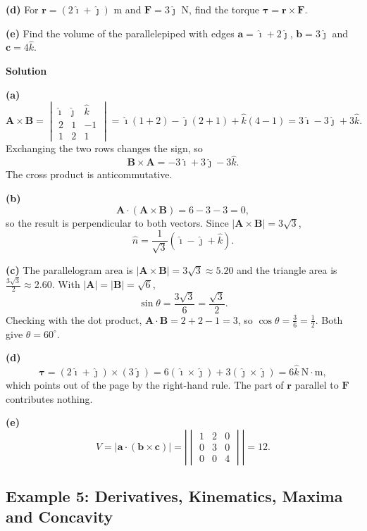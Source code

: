 \documentclass[../main.tex]{subfiles}
\begin{document}
\textbf{(d)} For $\mathbf{r} = (2\hat{\imath}+\hat{\jmath})$ m and $\mathbf{F} = 3\hat{\jmath}$ N, find the torque $\boldsymbol{\tau} = \mathbf{r}\times\mathbf{F}$.

\textbf{(e)} Find the volume of the parallelepiped with edges $\mathbf{a} = \hat{\imath}+2\hat{\jmath}$, $\mathbf{b} = 3\hat{\jmath}$ and $\mathbf{c} = 4\hat{k}$.

\bigskip
\textbf{Solution}

\textbf{(a)}
\[
\mathbf{A}\times\mathbf{B}
= \begin{vmatrix}
\hat{\imath} & \hat{\jmath} & \hat{k}\\
2 & 1 & -1\\
1 & 2 & 1
\end{vmatrix}
= \hat{\imath}(1+2) - \hat{\jmath}(2+1) + \hat{k}(4-1)
= 3\hat{\imath}-3\hat{\jmath}+3\hat{k}.
\]
Exchanging the two rows changes the sign, so
\[
\mathbf{B}\times\mathbf{A} = -3\hat{\imath}+3\hat{\jmath}-3\hat{k}.
\]
The cross product is anticommutative.

\textbf{(b)}
\[
\mathbf{A}\cdot(\mathbf{A}\times\mathbf{B}) = 6-3-3 = 0,
\]
so the result is perpendicular to both vectors. Since $|\mathbf{A}\times\mathbf{B}| = 3\sqrt{3}$,
\[
\hat{n} = \frac{1}{\sqrt{3}}\left(\hat{\imath}-\hat{\jmath}+\hat{k}\right).
\]

\textbf{(c)} The parallelogram area is $|\mathbf{A}\times\mathbf{B}| = 3\sqrt{3} \approx 5.20$ and the triangle area is $\frac{3\sqrt{3}}{2}\approx 2.60$. With $|\mathbf{A}| = |\mathbf{B}| = \sqrt{6}$,
\[
\sin\theta = \frac{3\sqrt{3}}{6} = \frac{\sqrt{3}}{2}.
\]
Checking with the dot product, $\mathbf{A}\cdot\mathbf{B} = 2+2-1 = 3$, so $\cos\theta = \frac{3}{6} = \frac{1}{2}$. Both give $\theta = 60^\circ$.

\textbf{(d)}
\[
\boldsymbol{\tau} = (2\hat{\imath}+\hat{\jmath})\times(3\hat{\jmath})
= 6(\hat{\imath}\times\hat{\jmath}) + 3(\hat{\jmath}\times\hat{\jmath})
= 6\hat{k}\ \text{N}\cdot\text{m},
\]
which points out of the page by the right-hand rule. The part of $\mathbf{r}$ parallel to $\mathbf{F}$ contributes nothing.

\textbf{(e)}
\[
V = \left|\mathbf{a}\cdot(\mathbf{b}\times\mathbf{c})\right|
= \left|
\begin{vmatrix}
1 & 2 & 0\\
0 & 3 & 0\\
0 & 0 & 4
\end{vmatrix}
\right| = 12 .
\]


\subsection{Example 5: Derivatives, Kinematics, Maxima and Concavity}
\end{document}

